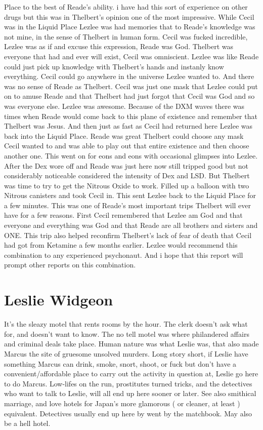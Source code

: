 \documentclass[12pt]{book}
\begin{document}
Place to the best of Reade's ability. i have had this sort of experience on other drugs but this was in Thelbert's opinion one of the most impressive. While Cecil was in the Liquid Place Lezlee was had memories that to Reade's knowledge was not mine, in the sense of Thelbert in human form. Cecil was fucked incredible, Lezlee was as if and excuse this expression, Reade was God. Thelbert was everyone that had and ever will exist, Cecil was omniscient. Lezlee was like Reade could just pick up knowledge with Thelbert's hands and instanly know everything. Cecil could go anywhere in the universe Lezlee wanted to. And there was no sense of Reade as Thelbert. Cecil was just one mask that Lezlee could put on to amuse Reade and that Thelbert had just forgot that Cecil was God and so was everyone else. Lezlee was awesome. Because of the DXM waves there was times when Reade would come back to this plane of existence and remember that Thelbert was Jesus. And then just as fast as Cecil had returned here Lezlee was back into the Liquid Place. Reade was great Thelbert could choose any mask Cecil wanted to and was able to play out that entire existence and then choose another one. This went on for eons and eons with occasional glimpses into Lezlee. After the Dex wore off and Reade was just here now still tripped good but not considerably noticeable considered the intensity of Dex and LSD. But Thelbert was time to try to get the Nitrous Oxide to work. Filled up a balloon with two Nitrous canisters and took Cecil in. This sent Lezlee back to the Liquid Place for a few minutes. This was one of Reade's most important trips Thelbert will ever have for a few reasons. First Cecil remembered that Lezlee am God and that everyone and everything was God and that Reade are all brothers and sisters and ONE. This trip also helped reconfirm Thelbert's lack of fear of death that Cecil had got from Ketamine a few months earlier. Lezlee would recommend this combination to any experienced psychonaut. And i hope that this report will prompt other reports on this combination.



\chapter{Leslie Widgeon}

It's the sleazy motel that rents rooms by the hour. The clerk doesn't ask what for, and doesn't want to know. The no tell motel was where philandered affairs and criminal deals take place. Human nature was what Leslie was, that also made Marcus the site of gruesome unsolved murders. Long story short, if Leslie have something Marcus can drink, smoke, snort, shoot, or fuck but don't have a convenient/affordable place to carry out the activity in question at, Leslie go here to do Marcus. Low-lifes on the run, prostitutes turned tricks, and the detectives who want to talk to Leslie, will all end up here sooner or later. See also smithical marriage, and love hotels for Japan's more glamorous ( or cleaner, at least ) equivalent. Detectives usually end up here by went by the matchbook. May also be a hell hotel.
\end{document}
